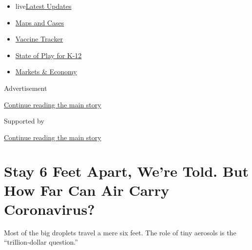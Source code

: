 \begin{itemize}
\tightlist
\item
  live\href{https://www.nytimes.com/2020/08/17/world/coronavirus-covid.html?name=styln-coronavirus-national\&region=TOP_BANNER\&variant=undefined\&block=storyline_menu_recirc\&action=click\&pgtype=Article\&impression_id=ac47b531-e108-11ea-a405-1f8dc8a57a4c}{Latest
  Updates}
\item
  \href{https://www.nytimes.com/interactive/2020/us/coronavirus-us-cases.html?name=styln-coronavirus-national\&region=TOP_BANNER\&variant=undefined\&block=storyline_menu_recirc\&action=click\&pgtype=Article\&impression_id=ac47dc40-e108-11ea-a405-1f8dc8a57a4c}{Maps
  and Cases}
\item
  \href{https://www.nytimes.com/interactive/2020/science/coronavirus-vaccine-tracker.html?name=styln-coronavirus-national\&region=TOP_BANNER\&variant=undefined\&block=storyline_menu_recirc\&action=click\&pgtype=Article\&impression_id=ac47dc41-e108-11ea-a405-1f8dc8a57a4c}{Vaccine
  Tracker}
\item
  \href{https://www.nytimes.com/2020/08/17/us/k-12-schools-reopening.html?name=styln-coronavirus-national\&region=TOP_BANNER\&variant=undefined\&block=storyline_menu_recirc\&action=click\&pgtype=Article\&impression_id=ac47dc42-e108-11ea-a405-1f8dc8a57a4c}{State
  of Play for K-12}
\item
  \href{https://www.nytimes.com/live/2020/08/17/business/stock-market-today-coronavirus?name=styln-coronavirus-national\&region=TOP_BANNER\&variant=undefined\&block=storyline_menu_recirc\&action=click\&pgtype=Article\&impression_id=ac47dc43-e108-11ea-a405-1f8dc8a57a4c}{Markets
  \& Economy}
\end{itemize}

Advertisement

\protect\hyperlink{after-top}{Continue reading the main story}

Supported by

\protect\hyperlink{after-sponsor}{Continue reading the main story}

\hypertarget{stay-6-feet-apart-were-told-but-how-far-can-air-carry-coronavirus}{%
\section{Stay 6 Feet Apart, We're Told. But How Far Can Air Carry
Coronavirus?}\label{stay-6-feet-apart-were-told-but-how-far-can-air-carry-coronavirus}}

Most of the big droplets travel a mere six feet. The role of tiny
aerosols is the ``trillion-dollar question.''

